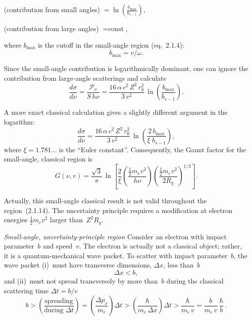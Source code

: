 \smallskip
\noindent(contribution from small angles)
$\displaystyle{}= \ln\!\left(\frac{b_{\max}}{b_{s-1}}\right)$,

\smallskip
\noindent(contribution from large angles) ${}= \text{const}$,

\smallskip
\noindent where $b_{\max}$ is the cutoff in the small-angle region
(eq.~2.1.4):
\begin{equation}
  b_{\max} = v/\omega.
  \tag{2.1.15}
\end{equation}

Since the small-angle contribution is logarithmically dominant, one can
ignore the contribution from large-angle scatterings and calculate
\begin{equation}
  \frac{d\sigma}{d\nu}
  = \frac{\mathscr{P}_\nu}{S\,h\nu}
  = \frac{16\,\alpha\,c^{2}\,Z^{2}\,r_0^{2}}{3\,v^{2}}\,
    \ln\!\left(\frac{b_{\max}}{b_{s-1}}\right).
  \tag{2.1.16}
\end{equation}

\noindent A more exact classical calculation gives a slightly different
argument in the logarithm:
\begin{equation}
  \frac{d\sigma}{d\nu}
  = \frac{16\,\alpha\,c^{2}\,Z^{2}\,r_0^{2}}{3\,v^{2}}\,
    \ln\!\left(\frac{2\,b_{\max}}{\xi\;b_{s-1}}\right),
  \tag{2.1.18}
\end{equation}
where $\xi = 1.781\ldots$ is the ``Euler constant''.  Consequently, the
Gaunt factor for the small-angle, classical region is
\begin{equation}
  G(\nu,v)
  = \frac{\sqrt{3}}{\pi}\,
    \ln\!\left[
      \frac{2}{\xi}
      \left(\frac{\tfrac{1}{2}m_e v^{2}}{h\nu}\right)
      \left(\frac{\tfrac{1}{2}m_e v^{2}}{2R_y}\right)^{\!1/2}
    \right].
  \tag{2.1.19}
\end{equation}

Actually, this small-angle classical result is not valid throughout the
region~(2.1.14).  The uncertainty principle requires a modification at
electron energies $\tfrac{1}{2}m_e v^{2}$ larger than~$Z^{2}R_y$.


\bigskip
\noindent\textit{Small-angle, uncertainty-principle region}\quad
Consider an electron with impact parameter~$b$ and speed~$v$.  The
electron is actually not a classical object; rather, it is a
quantum-mechanical wave packet.  To scatter with impact parameter~$b$,
the wave packet (i)~must have transverse dimensions, $\Delta x$, less
than~$b$
\begin{equation}
  \Delta x < b,
\end{equation}
and (ii)~must not spread transversely by more than~$b$ during the
classical scattering time $\Delta t = b/v$
\begin{equation}
  b > \left(\frac{\text{spreading}}{\text{during }\Delta t}\right)
  = \left(\frac{\Delta p_x}{m_e}\right)\Delta t
  > \left(\frac{\hbar}{m_e\,\Delta x}\right)\Delta t
  > \frac{\hbar}{m_e\,v}
  = \frac{b}{m_e\,v}\,\frac{\hbar}{b}\,.
\end{equation}

